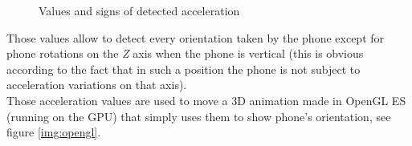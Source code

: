 \documentclass[conference]{IEEEtran}
\begin{document}
\begin{figure}[!ht]
\begin{center}
\caption{Values and signs of detected acceleration}
\end{center}
\end{figure}

Those values allow to detect every orientation taken by the phone except for phone rotations on the \textit{Z} axis when the phone is vertical (this is obvious according to the fact that in such a position the phone is not subject to acceleration variations on that axis).\\
Those acceleration values are used to move a 3D animation made in OpenGL ES (running on the GPU) that simply uses them to show phone's orientation, see figure \ref{img:opengl}.
\end{document}
